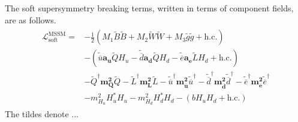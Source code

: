The soft supersymmetry breaking terms, written in terms of component fields, are as follows.
\begin{align*}
  \begin{split}
    \mathcal{L}_\text{soft}^\text{MSSM} = &-\frac{1}{2}\left(M_1\widetilde{B}\widetilde{B}+
    M_2\widetilde{W}\widetilde{W} + M_3\widetilde{g}\widetilde{g} + \text{h.c.}\right)\\
    &-\left(\widetilde{\overline{u}}\mathbf{a_u}\widetilde{Q}H_u-
    \widetilde{\overline{d}}\mathbf{a_d}\widetilde{Q}H_d-
    \widetilde{\overline{e}}\mathbf{a_e}\widetilde{L}H_d+\text{h.c.}\right)\\
    &-\widetilde{Q}^\dagger\mathbf{m_Q^2}\widetilde{Q}
     -\widetilde{L}^\dagger\mathbf{m_L^2}\widetilde{L}
     -\widetilde{\overline{u}}^\dagger\mathbf{m_{\overline{u}}^2}\widetilde{\overline{u}}^\dagger
     -\widetilde{\overline{d}}^\dagger\mathbf{m_{\overline{d}}^2}\widetilde{\overline{d}}^\dagger
     -\widetilde{\overline{e}}^\dagger\mathbf{m_{\overline{e}}^2}\widetilde{\overline{e}}^\dagger\\
     &-m^2_{H_u}H^*_uH_u-m^2_{H_d}H_d^*H_d-(bH_uH_d+\text{h.c.}) 
  \end{split}
\end{align*}
The tildes denote ...


